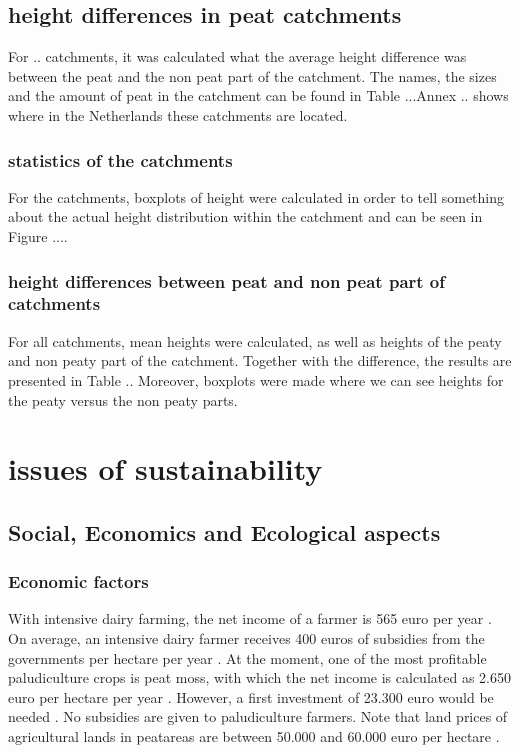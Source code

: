 \documentclass[a4paper,12pt]{scrbook}
\begin{document}
\section{height differences in peat catchments}
For .. catchments, it was calculated what the average height difference was between the peat and the non peat part of the catchment. The names, the sizes and the amount of peat in the catchment can be found in Table ...Annex .. shows where in the Netherlands these catchments are located.

\subsection{statistics of the catchments}
For the catchments, boxplots of height were calculated in order to tell something about the actual height distribution within the catchment and can be seen in Figure .... 

\subsection{height differences between peat and non peat part of catchments} 
For all catchments, mean heights were calculated, as well as heights of the peaty and non peaty part of the catchment. Together with the difference, the results are presented in Table .. Moreover, boxplots were made where we can see heights for the peaty versus the non peaty parts.


\chapter{issues of sustainability}

\section{Social, Economics and Ecological aspects}

\subsection{Economic factors}
With intensive dairy farming, the net income of a farmer is 565 euro per year \citep{riet2013}. On average, an intensive dairy farmer receives 400 euros of subsidies from the governments per hectare per year \citep{riet2013}. At the moment, one of the most profitable paludiculture crops is peat moss, with which the net income is calculated as 2.650 euro per hectare per year \citep{riet2013}. However, a first investment of 23.300 euro would be needed \citep{riet2013}. No subsidies are given to paludiculture farmers. Note that land prices of agricultural lands in peatareas are between 50.000 and 60.000 euro per hectare \citep{wur}.
\end{document}
